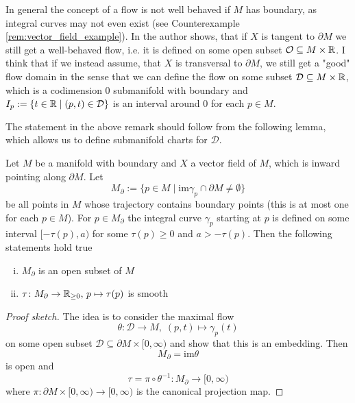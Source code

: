 \begin{remark}
    In general the concept of a flow is not well behaved if $M$ has boundary, as integral curves may not even exist (see Counterexample \ref{rem:vector_field_example}). In \cite{lee2011smooth} the author shows, that if $X$ is tangent to $\partial M$ we still get a well-behaved flow, i.e. it is defined on some open subset $\mathcal{O} \subseteq M \times \mathbb{R}$. I think that if we instead assume, that $X$ is transversal to $\partial M$, we still get a "good" flow domain in the sense that we can define the flow on some subset $\mathcal{D} \subseteq M \times \mathbb{R}$, which is a codimension $0$ submanifold with boundary and $I_p := \{ t \in \mathbb{R} \mid (p,t) \in \mathcal{D}\}$ is an interval around $0$ for each $p \in M$.
\end{remark}

The statement in the above remark should follow from the following lemma, which allows us to define submanifold charts for $\mathcal{D}$.

\begin{lemma}
    Let $M$ be a manifold with boundary and $X$ a vector field of $M$, which is inward pointing along $\partial M$. Let 
    \[
    M_{\partial} := \{p \in M \mid \mathrm{im}\gamma_p \cap \partial M \neq \emptyset\}
    \]
    be all points in $M$ whose trajectory contains boundary points (this is at most one for each $p \in M$). For $p \in M_\partial$ the integral curve $\gamma_p$ starting at $p$ is defined on some interval $[-\tau(p),a)$ for some $\tau(p) \geq 0$ and $a > -\tau(p)$. Then the following statements hold true
    \begin{enumerate}[(i)]
        \item $M_\partial$ is an open subset of $M$
        \item $\tau \colon M_\partial \to \mathbb{R}_{\geq 0}, \, p \mapsto \tau(p)$ is smooth
    \end{enumerate}
\end{lemma}
\begin{proof}[Proof sketch]
    The idea is to consider the maximal flow
    \[
    \theta \colon \mathcal{D} \to M, \; (p,t) \mapsto \gamma_p(t)
    \]
    on some open subset $\mathcal{D} \subseteq \partial M \times [0,\infty)$ and show that this is an embedding. Then 
    \[
    M_\partial = \mathrm{im} \theta
    \]
    is open and 
    \[
    \tau = \pi \circ \theta^{-1} \colon M_\partial \to [0,\infty)
    \]
    where $\pi \colon \partial M \times [0,\infty) \to [0,\infty)$ is the canonical projection map.
\end{proof}


